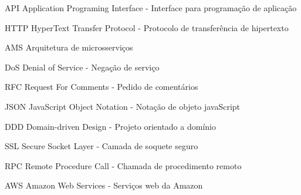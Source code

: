 
\begin{siglas}
	\item[API]{Application Programing Interface - Interface para programação de aplicação}
	\item[HTTP]{HyperText Transfer Protocol - Protocolo de transferência de hipertexto}
	\item[AMS]{Arquitetura de microsserviços}
	\item[DoS]{Denial of Service - Negação de serviço}
	\item[RFC]{Request For Comments - Pedido de comentários}
	\item[JSON]{JavaScript Object Notation - Notação de objeto javaScript}
	\item[DDD]{Domain-driven Design - Projeto orientado a domínio}
	\item[SSL]{Secure Socket Layer - Camada de soquete seguro}
	\item[RPC]{Remote Procedure Call - Chamada de procedimento remoto} 
	\item[AWS]{Amazon Web Services - Serviços web da Amazon} 
\end{siglas}